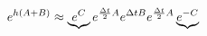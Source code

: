 \documentclass[preview]{standalone}
\begin{document}
\begin{align*}
\special{dvisvgm:raw <g id='unique000'>}e^{h(A+B)} \approx  \underbrace{e^C} e^{\frac{\Delta t}{2}A} e^{\Delta t B} e^{\frac{\Delta t}{2}A} \underbrace{e^{-C}}\special{dvisvgm:raw </g>}
\end{align*}
\end{document}
